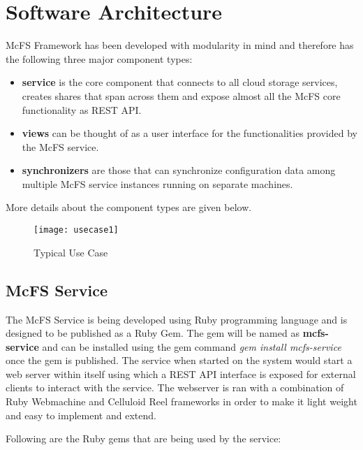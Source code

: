 \section{Software Architecture}
McFS Framework has been developed with modularity in mind and therefore has the following three major component types:

\begin{itemize}
	\item \textbf{service} is the core component that connects to all cloud storage services, creates shares that span across them and expose almost all the McFS core functionality as REST API.
	\item \textbf{views} can be thought of as a user interface for the functionalities provided by the McFS service.
	\item \textbf{synchronizers} are those that can synchronize configuration data among multiple McFS service instances running on separate machines.
\end{itemize}

More details about the component types are given below.

\begin{figure*}[t]
  \centering
  \texttt{[image: usecase1]}
  \caption{Typical Use Case}
\end{figure*}

\subsection{McFS Service}
The McFS Service is being developed using Ruby programming language and is designed to be published as a Ruby Gem\cite{site:rubygems}. The gem will be named as \textbf{mcfs-service} and can be installed using the gem command \textit{gem install mcfs-service} once the gem is published. The service when started on the system would start a web server within itself using which a REST API interface is exposed for external clients to interact with the service. The webserver is ran with a combination of Ruby Webmachine\cite{site:webmachineruby} and Celluloid Reel\cite{site:celluloidreel} frameworks in order to make it light weight and easy to implement and extend.

Following are the Ruby gems that are being used by the service:

